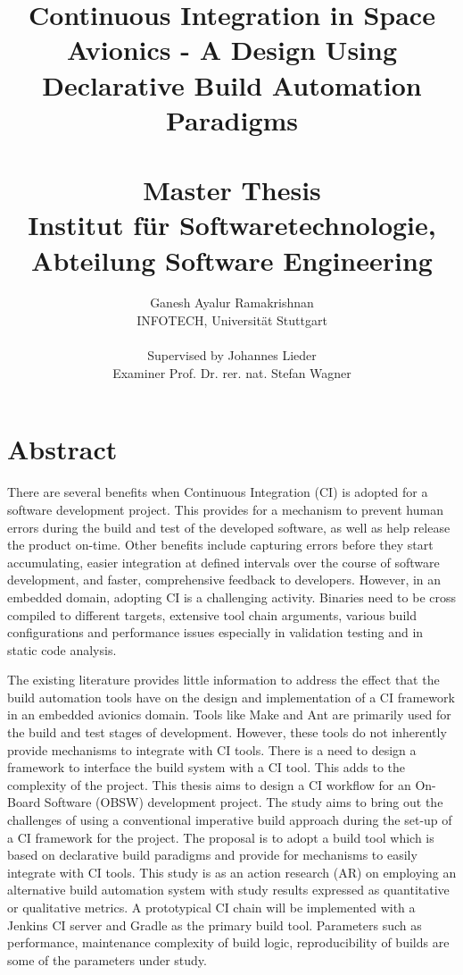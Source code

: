 \documentclass[12pt, a4paper, titlepage]{scrartcl}
\title{Continuous Integration in Space Avionics - A Design Using Declarative Build Automation Paradigms\\
\ \\
{\large Master Thesis \\
	Institut für Softwaretechnologie, \\
	Abteilung Software Engineering
\\
}
}
\author{Ganesh Ayalur Ramakrishnan  \\
  INFOTECH, Universität Stuttgart  \\
  \\
  Supervised by Johannes Lieder \\
  Examiner Prof. Dr. rer. nat. Stefan Wagner
}
\begin{document}
\maketitle
\tableofcontents 
\newpage

\section{Abstract}

\par There are several benefits when Continuous Integration (CI) is adopted for a software
development project. This provides for a mechanism to prevent human errors during
the build and test of the developed software, as well as help release the product on-time.
Other benefits include capturing errors before they start accumulating, easier integration
at defined intervals over the course of software development, and faster, comprehensive
feedback to developers. However, in an embedded domain, adopting CI is a challenging
activity. Binaries need to be cross compiled to different targets, extensive tool chain
arguments, various build configurations and performance issues especially in validation
testing and in static code analysis.
\par The existing literature provides little information to address the effect that the build
automation tools have on the design and implementation of a CI framework in an embedded
avionics domain. Tools like Make and Ant are primarily used for the build and
test stages of development. However, these tools do not inherently provide mechanisms
to integrate with CI tools. There is a need to design a framework to interface the build
system with a CI tool. This adds to the complexity of the project.
This thesis aims to design a CI workflow for an On-Board Software (OBSW) development
project. The study aims to bring out the challenges of using a conventional imperative
build approach during the set-up of a CI framework for the project. The proposal
is to adopt a build tool which is based on declarative build paradigms and provide
for mechanisms to easily integrate with CI tools. This study is as an action research
(AR) on employing an alternative build automation system with study results expressed
as quantitative or qualitative metrics. A prototypical CI chain will be implemented
with a Jenkins CI server and Gradle as the primary build tool. Parameters such as
performance, maintenance complexity of build logic, reproducibility of builds are some
of the parameters under study.
\end{document}
